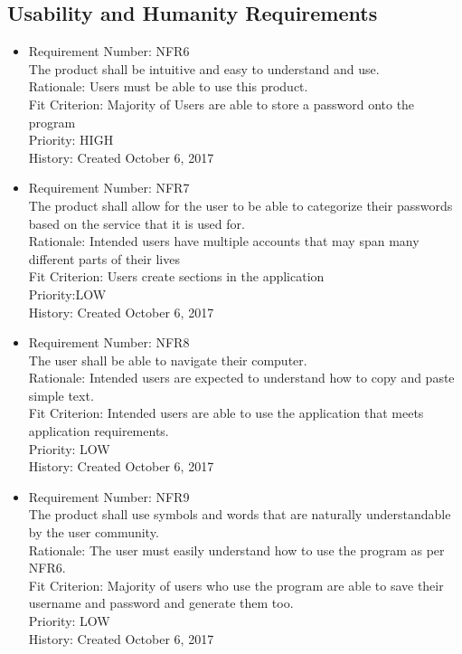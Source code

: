 \documentclass[12pt, titlepage]{article}
\begin{document}
\subsection{Usability and Humanity Requirements}
\begin{itemize}
	\item Requirement Number: NFR6\\
The product shall be intuitive and easy to understand and use.\\
Rationale: Users must be able to use this product.\\
Fit Criterion: Majority of Users are able to store a password onto the program\\
Priority: HIGH\\
History: Created October 6, 2017

	\item Requirement Number: NFR7\\
The product shall allow for the user to be able to categorize their passwords based on the service that it is used for.\\
Rationale: Intended users have multiple accounts that may span many different parts of their lives \\
Fit Criterion: Users create sections in the application\\
Priority:LOW\\
History: Created October 6, 2017

	\item Requirement Number: NFR8\\
The user shall be able to navigate their computer.\\
Rationale: Intended users are expected to understand how to copy and paste simple text.\\
Fit Criterion: Intended users are able to use the application that meets application requirements.\\
Priority: LOW\\
History: Created October 6, 2017

	\item Requirement Number: NFR9\\
The product shall use symbols and words that are naturally understandable by the user community.\\
Rationale: The user must easily understand how to use the program as per NFR6.\\
Fit Criterion: Majority of users who use the program are able to save their username and password and generate them too.\\
Priority: LOW\\
History: Created October 6, 2017


\end{itemize}
\end{document}
